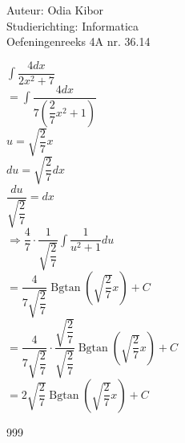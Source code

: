 \documentclass[a4paper]{article}
\begin{document}
  
\noindent \large Auteur: Odia Kibor \\
\noindent \large Studierichting: Informatica\\
\noindent \large Oefeningenreeks 4A nr. 36.14
\\

\medskip

\normalsize


$ \displaystyle\int \dfrac{4dx}{2x^2 + 7} $\\

$= \displaystyle\int \dfrac{4dx}{7\left(\dfrac{2}{7}x^2 +1\right)} $\\

$u = \sqrt{\dfrac{2}{7}} x$\\

$du =  \sqrt{\dfrac{2}{7}} dx$\\

$\dfrac{du}{\sqrt{\dfrac{2}{7}}} = dx$\\

$\Rightarrow \dfrac{4}{7} \cdot \dfrac{1}{\sqrt{\dfrac{2}{7}}} \displaystyle\int\dfrac{1}{u^2 + 1} du $\\

$ = \dfrac{4}{7\sqrt{\dfrac{2}{7}}} \operatorname{Bgtan}\left(\sqrt{\dfrac{2}{7}}x\right) + C $\\

$ = \dfrac{4}{7\sqrt{\dfrac{2}{7}}} \cdot \dfrac{\sqrt{\dfrac{2}{7}}}{\sqrt{\dfrac{2}{7}}}\operatorname{Bgtan}\left(\sqrt{\dfrac{2}{7}}x\right) + C $\\

$ = 2\sqrt{\dfrac{2}{7}}\operatorname{Bgtan}\left(\sqrt{\dfrac{2}{7}}x\right) + C $\\


















\begin{thebibliography}{999}
\end{thebibliography}
\end{document}
